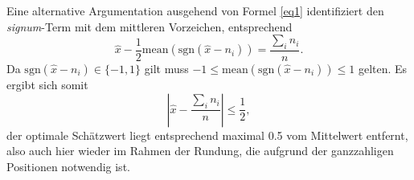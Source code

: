 \documentclass[fleqn,usenatbib]{scrartcl}
\begin{document}
Eine alternative Argumentation ausgehend von Formel \ref{eq1} identifiziert den \textit{signum}-Term mit dem mittleren Vorzeichen, 
entsprechend
\begin{equation*}
    \hat{x} - \frac{1}{2} \mathrm{mean}(\mathrm{sgn}(\hat{x}-n_{i})) = \frac{\sum_{i} n_{i}}{n}.
\end{equation*}
Da $\mathrm{sgn}(\hat{x}-n_{i}) \in \{-1, 1 \}$ gilt muss $-1 \le \mathrm{mean}(\mathrm{sgn}(\hat{x}-n_{i})) \le 1$
gelten. Es ergibt sich somit 
\begin{equation}
    \left| \hat{x} - \frac{\sum_{i} n_{i}}{n} \right| \le \frac{1}{2},
\end{equation}
der optimale Schätzwert liegt entsprechend maximal 0.5 vom Mittelwert entfernt, also auch hier wieder im Rahmen der Rundung, die aufgrund der ganzzahligen 
Positionen notwendig ist.
\end{document}
